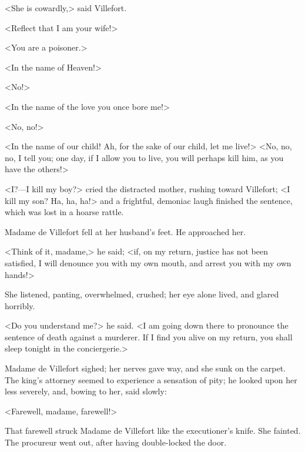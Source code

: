  <She is cowardly,> said Villefort. 

 <Reflect that I am your wife!> 

 <You are a poisoner.> 

 <In the name of Heaven!> 

 <No!> 

 <In the name of the love you once bore me!> 

 <No, no!> 

 <In the name of our child! Ah, for the sake of our child, let me live!>  <No, no, no, I tell you; one day, if I allow you to live, you will perhaps kill him, as you have the others!> 

 <I?—I kill my boy?> cried the distracted mother, rushing toward Villefort; <I kill my son? Ha, ha, ha!> and a frightful, demoniac laugh finished the sentence, which was lost in a hoarse rattle. 

 Madame de Villefort fell at her husband's feet. He approached her. 

 <Think of it, madame,> he said; <if, on my return, justice has not been satisfied, I will denounce you with my own mouth, and arrest you with my own hands!> 

 She listened, panting, overwhelmed, crushed; her eye alone lived, and glared horribly. 

 <Do you understand me?> he said. <I am going down there to pronounce the sentence of death against a murderer. If I find you alive on my return, you shall sleep tonight in the conciergerie.> 

 Madame de Villefort sighed; her nerves gave way, and she sunk on the carpet. The king's attorney seemed to experience a sensation of pity; he looked upon her less severely, and, bowing to her, said slowly: 

 <Farewell, madame, farewell!> 

 That farewell struck Madame de Villefort like the executioner's knife. She fainted. The procureur went out, after having double-locked the door. 